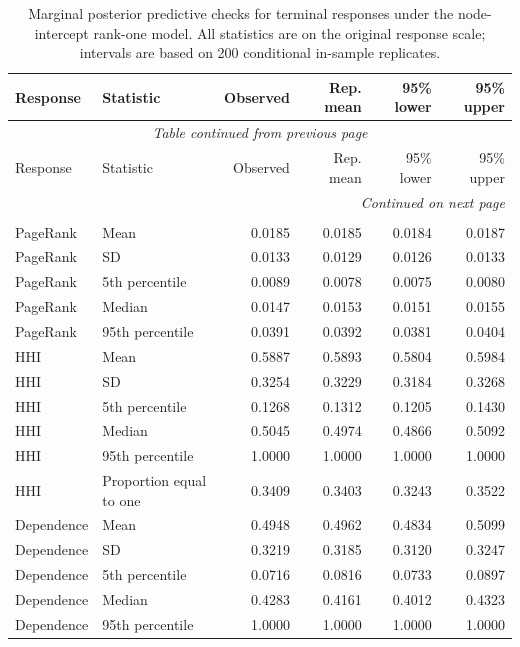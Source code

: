 \documentclass[pdftex,12pt,openright,a4paper,oneside]{book}
\begin{document}
\begingroup
\small
\setlength{\LTleft}{0pt}
\setlength{\LTright}{0pt}
\begin{longtable}{llrrrr}
\caption{Marginal posterior predictive checks for terminal responses under the node-intercept rank-one model. All statistics are on the original response scale; intervals are based on 200 conditional in-sample replicates.}
\label{tab:node_terminal_marginal_ppc_full}\\
\toprule
Response & Statistic & Observed & Rep. mean & 95\% lower & 95\% upper \\
\midrule
\endfirsthead
\multicolumn{6}{c}{\textit{Table continued from previous page}}\\
\toprule
Response & Statistic & Observed & Rep. mean & 95\% lower & 95\% upper \\
\midrule
\endhead
\midrule
\multicolumn{6}{r}{\textit{Continued on next page}}\\
\endfoot
\bottomrule
\endlastfoot
\multicolumn{6}{l}{\textit{All terminals}}\\
\midrule
PageRank & Mean & 0.0185 & 0.0185 & 0.0184 & 0.0187 \\
PageRank & SD & 0.0133 & 0.0129 & 0.0126 & 0.0133 \\
PageRank & 5th percentile & 0.0089 & 0.0078 & 0.0075 & 0.0080 \\
PageRank & Median & 0.0147 & 0.0153 & 0.0151 & 0.0155 \\
PageRank & 95th percentile & 0.0391 & 0.0392 & 0.0381 & 0.0404 \\
\addlinespace[2pt]
HHI & Mean & 0.5887 & 0.5893 & 0.5804 & 0.5984 \\
HHI & SD & 0.3254 & 0.3229 & 0.3184 & 0.3268 \\
HHI & 5th percentile & 0.1268 & 0.1312 & 0.1205 & 0.1430 \\
HHI & Median & 0.5045 & 0.4974 & 0.4866 & 0.5092 \\
HHI & 95th percentile & 1.0000 & 1.0000 & 1.0000 & 1.0000 \\
HHI & Proportion equal to one & 0.3409 & 0.3403 & 0.3243 & 0.3522 \\
\addlinespace[2pt]
Dependence & Mean & 0.4948 & 0.4962 & 0.4834 & 0.5099 \\
Dependence & SD & 0.3219 & 0.3185 & 0.3120 & 0.3247 \\
Dependence & 5th percentile & 0.0716 & 0.0816 & 0.0733 & 0.0897 \\
Dependence & Median & 0.4283 & 0.4161 & 0.4012 & 0.4323 \\
Dependence & 95th percentile & 1.0000 & 1.0000 & 1.0000 & 1.0000 \\

\end{longtable}
\end{document}
